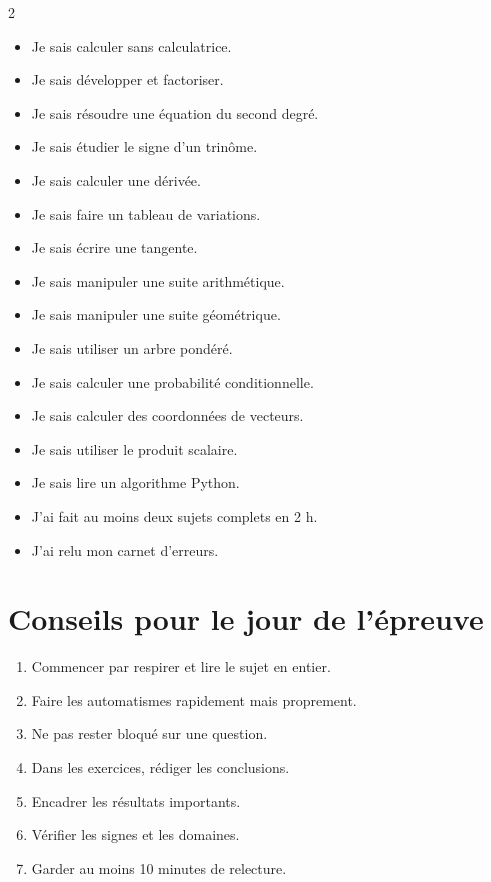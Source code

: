 \documentclass[11pt,a4paper]{article}
\newcommand{\casevide}{\ding{113}}
\begin{document}
\begin{multicols}{2}
\begin{itemize}
  \item[\casevide] Je sais calculer sans calculatrice.
  \item[\casevide] Je sais développer et factoriser.
  \item[\casevide] Je sais résoudre une équation du second degré.
  \item[\casevide] Je sais étudier le signe d'un trinôme.
  \item[\casevide] Je sais calculer une dérivée.
  \item[\casevide] Je sais faire un tableau de variations.
  \item[\casevide] Je sais écrire une tangente.
  \item[\casevide] Je sais manipuler une suite arithmétique.
  \item[\casevide] Je sais manipuler une suite géométrique.
  \item[\casevide] Je sais utiliser un arbre pondéré.
  \item[\casevide] Je sais calculer une probabilité conditionnelle.
  \item[\casevide] Je sais calculer des coordonnées de vecteurs.
  \item[\casevide] Je sais utiliser le produit scalaire.
  \item[\casevide] Je sais lire un algorithme Python.
  \item[\casevide] J'ai fait au moins deux sujets complets en 2 h.
  \item[\casevide] J'ai relu mon carnet d'erreurs.
\end{itemize}
\end{multicols}

\section{Conseils pour le jour de l'épreuve}

\begin{methode}
\begin{enumerate}
  \item Commencer par respirer et lire le sujet en entier.
  \item Faire les automatismes rapidement mais proprement.
  \item Ne pas rester bloqué sur une question.
  \item Dans les exercices, rédiger les conclusions.
  \item Encadrer les résultats importants.
  \item Vérifier les signes et les domaines.
  \item Garder au moins 10 minutes de relecture.
\end{enumerate}
\end{methode}
\end{document}
